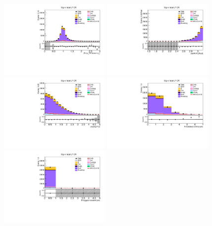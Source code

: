 \begin{figure}[tbp]
  \begin{center}
    \includegraphics[width=0.48\textwidth]{figures/wlnhbb2016/boosted/WmnWHLightFlavorFJCR_fj1WPtBalance.pdf}
    \includegraphics[width=0.48\textwidth]{figures/wlnhbb2016/boosted/WmnWHLightFlavorFJCR_deltaPhiVH.pdf}
    \includegraphics[width=0.48\textwidth]{figures/wlnhbb2016/boosted/WmnWHLightFlavorFJCR_dEtal1fj1.pdf}
    \includegraphics[width=0.48\textwidth]{figures/wlnhbb2016/boosted/WmnWHLightFlavorFJCR_nIsojet.pdf}
    \includegraphics[width=0.48\textwidth]{figures/wlnhbb2016/boosted/WmnWHLightFlavorFJCR_isojetNBtags.pdf}

\end{center}
\end{figure}
